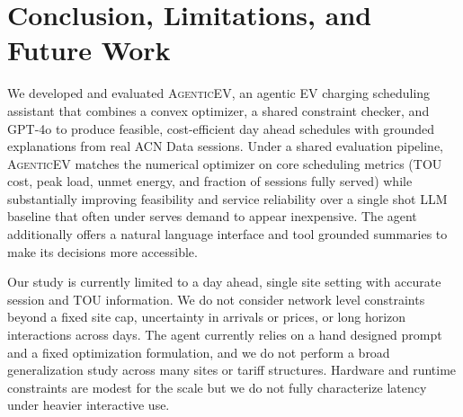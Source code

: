 \documentclass{article}
\newcommand{\modelname}{\textsc{AgenticEV}}
\begin{document}
\section{Conclusion, Limitations, and Future Work}
We developed and evaluated \modelname{}, an agentic EV charging scheduling assistant that combines a convex optimizer, a shared constraint checker, and GPT-4o to produce feasible, cost-efficient day ahead schedules with grounded explanations from real ACN Data sessions. Under a shared evaluation pipeline, \modelname{} matches the numerical optimizer on core scheduling metrics (TOU cost, peak load, unmet energy, and fraction of sessions fully served) while substantially improving feasibility and service reliability over a single shot LLM baseline that often under serves demand to appear inexpensive. The agent additionally offers a natural language interface and tool grounded summaries to make its decisions more accessible.

Our study is currently limited to a day ahead, single site setting with accurate session and TOU information. We do not consider network level constraints beyond a fixed site cap, uncertainty in arrivals or prices, or long horizon interactions across days. The agent currently relies on a hand designed prompt and a fixed optimization formulation, and we do not perform a broad generalization study across many sites or tariff structures. Hardware and runtime constraints are modest for the scale but we do not fully characterize latency under heavier interactive use.
\end{document}

